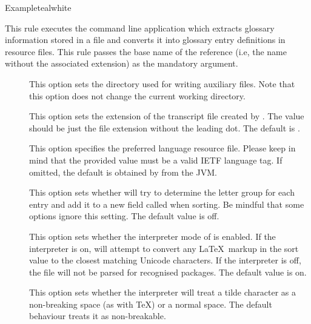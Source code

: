 \begin{description}
\begin{codebox}{Example}{teal}{\icnote}{white}
\end{codebox}

\item[\rulebox{bib2gls}{Nicola Talbot, Paulo Cereda}] This rule executes the  command line application which extracts glossary information stored in a  file and converts it into glossary entry definitions in resource files. This rule passes the base name of the  reference (i.e, the name without the associated extension) as the mandatory argument.

\begin{description}
\item[] This option sets the directory used for writing auxiliary files. Note that this option does not change the current working directory.

\item[] This option sets the extension of the transcript file created by . The value should be just the file extension without the leading dot. The default is .

\item[] This option specifies the preferred language resource file. Please keep in mind that the provided value must be a valid \gls{IETF} language tag. If omitted, the default is obtained by  from the \gls{JVM}.

\item[] This option sets whether  will try to determine the letter group for each entry and add it to a new field called  when sorting. Be mindful that some  options ignore this setting. The default value is off.

\item[] This option sets whether the interpreter mode of  is enabled. If the interpreter is on,  will attempt to convert any \LaTeX\ markup in the sort value to the closest matching Unicode characters. If the interpreter is off, the  file will not be parsed for recognised packages. The default value is on.

\item[] This option sets whether the interpreter will treat a tilde character as a non-breaking space (as with \TeX) or a normal space. The default behaviour treats it as non-breakable.


\end{description}
\end{description}
